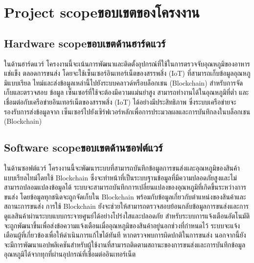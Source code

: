 \section{\ifenglish Project scope\else ขอบเขตของโครงงาน\fi}

\subsection{\ifenglish Hardware scope\else ขอบเขตด้านฮาร์ดแวร์\fi}
\sloppy
ในด้านฮาร์ดแวร์ โครงงานนี้จะเน้นการพัฒนาและติดตั้งอุปกรณ์ที่ใช้ในการตรวจจับอุณหภูมิของอาหารแช่แข็ง
ตลอดการขนส่ง โดยจะใช้เซ็นเซอร์อินเทอร์เน็ตของสรรพสิ่ง (IoT) ที่สามารถเก็บข้อมูลอุณหภูมิแบบเรียล
ไทม์และส่งข้อมูลเหล่านี้ไปยังระบบคลาวด์หรือบล็อกเชน (Blockchain) สำหรับการจัดเก็บและตรวจสอบ
ข้อมูล เซ็นเซอร์ที่ใช้จะต้องมีความแม่นยำสูง สามารถทำงานได้ในอุณหภูมิที่ต่ำ และเชื่อมต่อกับเครือข่ายอินเทอร์เน็ตของสรรพสิ่ง (IoT) ได้อย่างมีประสิทธิภาพ ซึ่งระบบเครือข่ายจะรองรับการส่งข้อมูลจาก
เซ็นเซอร์ไปยังเซิร์ฟเวอร์หลักเพื่อการประมวลผลและการบันทึกลงในบล็อกเชน (Blockchain)

\subsection{\ifenglish Software scope\else ขอบเขตด้านซอฟต์แวร์\fi}
\sloppy
ในด้านซอฟต์แวร์ โครงงานนี้จะพัฒนาระบบที่สามารถบันทึกข้อมูลการขนส่งและอุณหภูมิของสินค้าแบบเรียลไทม์โดยใช้ Blockchain ซึ่งจะทำหน้าที่เป็นระบบฐานข้อมูลที่มีความปลอดภัยสูงและไม่สามารถปลอมแปลงข้อมูลได้ ระบบจะสามารถบันทึกการเปลี่ยนแปลงของอุณหภูมิที่เกิดขึ้นระหว่างการขนส่ง โดยข้อมูลทุกชนิดจะถูกจัดเก็บใน Blockchain พร้อมกับข้อมูลเกี่ยวกับตำแหน่งของสินค้าและสถานะการขนส่ง การใช้ Blockchain ยังจะช่วยให้สามารถตรวจสอบย้อนกลับข้อมูลการขนส่งและการดูแลสินค้าผ่านระบบแบบกระจายศูนย์ได้อย่างโปร่งใสและปลอดภัย สำหรับระบบการแจ้งเตือนอัตโนมัติ จะถูกพัฒนาขึ้นเพื่อส่งข้อความแจ้งเตือนเมื่ออุณหภูมิของสินค้าอยู่นอกช่วงที่กำหนดไว้ ระบบจะแจ้งเตือนผู้ที่เกี่ยวข้องเพื่อให้ดำเนินการแก้ไขได้ทันที หากตรวจพบการผิดปกติในการขนส่ง นอกจากนี้ยังจะมีการพัฒนาแอปพลิเคชันสำหรับผู้ใช้งานที่สามารถติดตามสถานะของการขนส่งและการบันทึกข้อมูลอุณหภูมิได้จากทุกที่ผ่านอุปกรณ์ที่เชื่อมต่ออินเทอร์เน็ต

